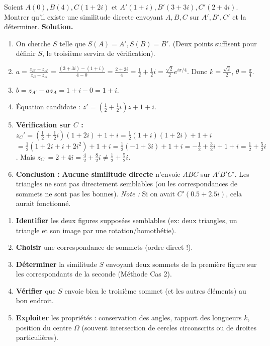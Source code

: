 \documentclass[11pt]{article}
\begin{document}
\begin{exoresolu}
Soient $A(0), B(4), C(1+2i)$ et $A'(1+i), B'(3+3i), C'(2+4i)$.
Montrer qu'il existe une similitude directe envoyant $A,B,C$ sur $A',B',C'$ et la d\'eterminer.
\tcblower
\textbf{Solution.}
\begin{enumerate}
\item On cherche $S$ telle que $S(A)=A', S(B)=B'$. (Deux points suffisent pour d\'efinir $S$, le troisi\`eme servira de v\'erification).
\item $a = \frac{z_{B'}-z_{A'}}{z_B-z_A} = \frac{(3+3i)-(1+i)}{4-0} = \frac{2+2i}{4} = \frac{1}{2}+\frac{1}{2}i = \frac{\sqrt{2}}{2}e^{i\pi/4}$.
      Donc $k = \frac{\sqrt{2}}{2}$, $\theta = \frac{\pi}{4}$.
\item $b = z_{A'} - a z_A = 1+i - 0 = 1+i$.
\item \'Equation candidate : $z' = \left(\frac{1}{2}+\frac{1}{2}i\right)z + 1+i$.
\item \textbf{V\'erification sur $C$ :}
      $z_C' = \left(\frac{1}{2}+\frac{1}{2}i\right)(1+2i) + 1+i = \frac{1}{2}(1+i)(1+2i) + 1+i$
      $= \frac{1}{2}(1+2i+i+2i^2) + 1+i = \frac{1}{2}(-1+3i) + 1+i = -\frac{1}{2}+\frac{3}{2}i + 1+i = \frac{1}{2} + \frac{5}{2}i$.
      Mais $z_{C'} = 2+4i = \frac{4}{2} + \frac{8}{2}i \neq \frac{1}{2} + \frac{5}{2}i$.
\item \textbf{Conclusion :} \textbf{Aucune similitude directe} n'envoie $ABC$ sur $A'B'C'$. Les triangles ne sont pas directement semblables (ou les correspondances de sommets ne sont pas les bonnes).
      \emph{Note :} Si on avait $C'(0.5+2.5i)$, cela aurait fonctionn\'e.
\end{enumerate}

\end{exoresolu}

\begin{methode}
\begin{enumerate}
\item \textbf{Identifier} les deux figures suppos\'ees semblables (ex: deux triangles, un triangle et son image par une rotation/homoth\'etie).
\item \textbf{Choisir} une correspondance de sommets (ordre direct !).
\item \textbf{D\'eterminer} la similitude $S$ envoyant deux sommets de la premi\`ere figure sur les correspondants de la seconde (M\'ethode Cas 2).
\item \textbf{V\'erifier} que $S$ envoie bien le troisi\`eme sommet (et les autres \'el\'ements) au bon endroit.
\item \textbf{Exploiter} les propri\'et\'es : conservation des angles, rapport des longueurs $k$, position du centre $\Omega$ (souvent intersection de cercles circonscrits ou de droites particuli\`eres).
\end{enumerate}
\end{methode}
\end{document}
